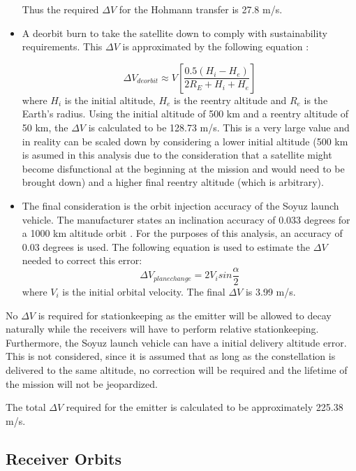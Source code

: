 \begin{itemize}
		Thus the required $\Delta V$ for the Hohmann transfer is 27.8 m/s.
	\item A deorbit burn to take the satellite down to comply with sustainability requirements. This $\Delta V$ is approximated by the following equation \cite{constDesign}:
	
	\begin{equation}
			\Delta V_{deorbit} \approx V \left[ \frac{0.5(H_i - H_e)}{2R_E + H_i + H_e} \right]
		\end{equation}
	where $H_i$ is the initial altitude, $H_e$ is the reentry altitude and $R_e$ is the Earth's radius. Using the initial altitude of 500 km and a reentry altitude of 50 km, the $\Delta V$ is calculated to be 128.73 m/s. This is a very large value and in reality can be scaled down by considering a lower initial altitude (500 km is asumed in this analysis due to the consideration that a satellite might become disfunctional at the beginning at the mission and would need to be brought down) and a higher final reentry altitude (which is arbitrary). 
	
	\item The final consideration is the orbit injection accuracy of the Soyuz launch vehicle. The manufacturer states an inclination accuracy of 0.033 degrees for a 1000 km altitude orbit \cite{soyuzman}. For the purposes of this analysis, an accuracy of 0.03 degrees is used. The following equation is used to estimate the $\Delta V$ needed to correct this error:
	\begin{equation}
			\Delta V_{plane change} = 2V_i sin \frac{\alpha}{2}
		\end{equation}
	  where $V_i$ is the initial orbital velocity. The final $\Delta V$ is 3.99 m/s.
\end{itemize}

No $\Delta V$ is required for stationkeeping as the emitter will be allowed to decay naturally while the receivers will have to perform relative stationkeeping. Furthermore, the Soyuz launch vehicle can have a initial delivery altitude error. This is not considered, since it is assumed that as long as the constellation is delivered to the same altitude, no correction will be required and the lifetime of the mission will not be jeopardized. 

The total $\Delta V$ required for the emitter is calculated to be approximately 225.38 m/s.




\subsection{Receiver Orbits}
\label{frSSRO}

